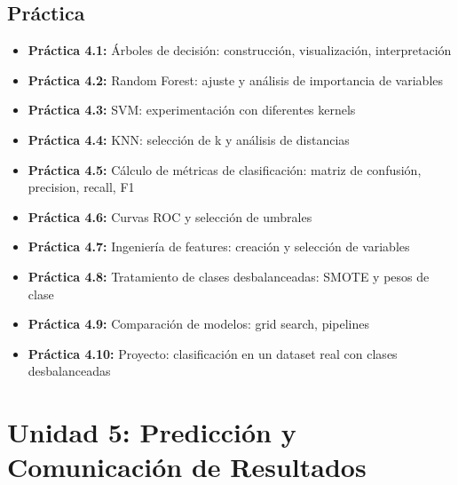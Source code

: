 \documentclass[a4paper,11pt]{article}
\begin{document}
\subsection{Práctica}
\begin{itemize}[leftmargin=*, labelindent=0pt, label={\textcolor{practicacolor}{$\blacktriangleright$}}]
    \item \textbf{Práctica 4.1:} Árboles de decisión: construcción, visualización, interpretación
    \item \textbf{Práctica 4.2:} Random Forest: ajuste y análisis de importancia de variables
    \item \textbf{Práctica 4.3:} SVM: experimentación con diferentes kernels
    \item \textbf{Práctica 4.4:} KNN: selección de k y análisis de distancias
    \item \textbf{Práctica 4.5:} Cálculo de métricas de clasificación: matriz de confusión, precision, recall, F1
    \item \textbf{Práctica 4.6:} Curvas ROC y selección de umbrales
    \item \textbf{Práctica 4.7:} Ingeniería de features: creación y selección de variables
    \item \textbf{Práctica 4.8:} Tratamiento de clases desbalanceadas: SMOTE y pesos de clase
    \item \textbf{Práctica 4.9:} Comparación de modelos: grid search, pipelines
    \item \textbf{Práctica 4.10:} Proyecto: clasificación en un dataset real con clases desbalanceadas
\end{itemize}

\section{Unidad 5: Predicción y Comunicación de Resultados}
\end{document}
